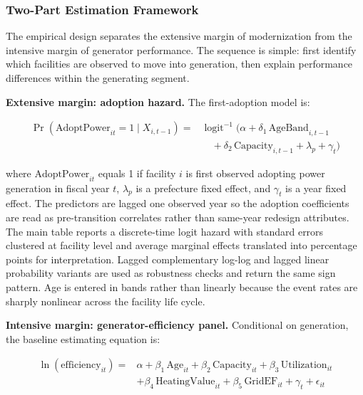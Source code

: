 \documentclass[12pt,a4paper]{article}
\begin{document}
\subsubsection{Two-Part Estimation Framework}

The empirical design separates the extensive margin of modernization from the intensive margin of generator performance. The sequence is simple: first identify which facilities are observed to move into generation, then explain performance differences within the generating segment.

\textbf{Extensive margin: adoption hazard.} The first-adoption model is:

\begin{equation}
\begin{aligned}
\Pr(\text{AdoptPower}_{it}=1 \mid X_{i,t-1}) ={}& \operatorname{logit}^{-1}\bigl(\alpha + \delta_1\,\text{AgeBand}_{i,t-1} \\
& \quad + \delta_2\,\text{Capacity}_{i,t-1} + \lambda_p + \gamma_t\bigr)
\end{aligned}
\end{equation}

where $\text{AdoptPower}_{it}$ equals 1 if facility $i$ is first observed adopting power generation in fiscal year $t$, $\lambda_p$ is a prefecture fixed effect, and $\gamma_t$ is a year fixed effect. The predictors are lagged one observed year so the adoption coefficients are read as pre-transition correlates rather than same-year redesign attributes. The main table reports a discrete-time logit hazard with standard errors clustered at facility level and average marginal effects translated into percentage points for interpretation. Lagged complementary log-log and lagged linear probability variants are used as robustness checks and return the same sign pattern. Age is entered in bands rather than linearly because the event rates are sharply nonlinear across the facility life cycle.

\textbf{Intensive margin: generator-efficiency panel.} Conditional on generation, the baseline estimating equation is:

\begin{equation}
\begin{aligned}
\ln(\text{efficiency}_{it}) ={} & \alpha + \beta_1\,\text{Age}_{it} + \beta_2\,\text{Capacity}_{it} + \beta_3\,\text{Utilization}_{it} \\
                                & + \beta_4\,\text{HeatingValue}_{it} + \beta_5\,\text{GridEF}_{it} + \gamma_t + \epsilon_{it}
\end{aligned}
\end{equation}
\end{document}
